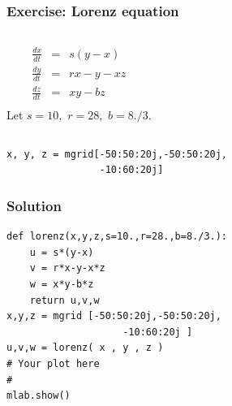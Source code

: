 \documentclass[compress,14pt]{beamer}
\newcounter{time}
\newcommand{\inctime}[1]{\addtocounter{time}{#1}{\vspace*{0.1in}\tiny \thetime\ m}}
\begin{document}
\begin{frame}[fragile]
    \frametitle{Exercise: Lorenz equation}
    \begin{columns}
        \begin{eqnarray*}
        \frac{d x}{dt} &=& s (y-x)\\
        \frac{d y}{d t} &=& rx -y -xz\\
        \frac{d z}{d t} &=& xy - bz\\
        \end{eqnarray*}
        Let $s=10,$
        $r=28,$ 
        $b=8./3.$
    \end{columns}
  \begin{lstlisting}
x, y, z = mgrid[-50:50:20j,-50:50:20j,
                -10:60:20j]
  \end{lstlisting}
\inctime{20}

\end{frame}
\begin{frame}[fragile]
    \frametitle{Solution}
  \begin{lstlisting}
def lorenz(x,y,z,s=10.,r=28.,b=8./3.):
    u = s*(y-x)
    v = r*x-y-x*z
    w = x*y-b*z
    return u,v,w
x,y,z = mgrid [-50:50:20j,-50:50:20j,
                    -10:60:20j ]
u,v,w = lorenz( x , y , z )
# Your plot here
#
mlab.show()

  \end{lstlisting}
\end{frame}
  
\end{document}
